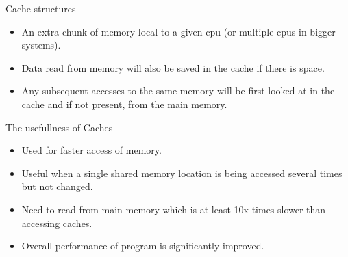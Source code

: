 \documentclass[notes, xcolor = dvipsnames]{beamer}
\begin{document}
    \begin{frame}{Cache structures}
        
        \begin{figure}
        \end{figure}

        \begin{itemize}
            \item An extra chunk of memory local to a given cpu (or multiple cpus in bigger systems).
            \item Data read from memory will also be saved in the cache if there is space. 
            \item Any subsequent accesses to the same memory will be first looked at in the cache and if not present, from the main memory.
        \end{itemize}

    \end{frame}

    \begin{frame}{The usefullness of Caches}
        
        \begin{itemize}
            \item Used for faster access of memory. 
            \item Useful when a single shared memory location is being accessed several times but not changed. 
            \item Need to read from main memory which is at least 10x times slower than accessing caches.
            \item Overall performance of program is significantly improved. 
        \end{itemize}

    \end{frame}
\end{document}
